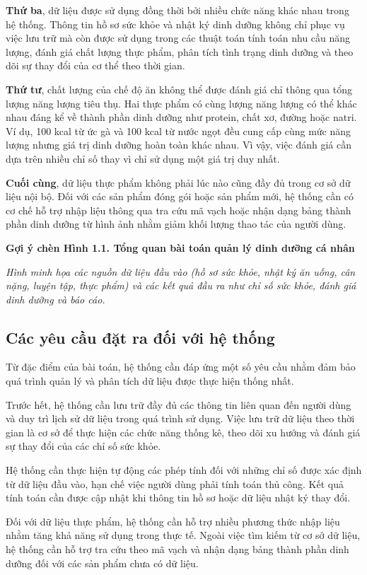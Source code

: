 \documentclass[12pt, a4paper]{report}
\begin{document}
\textbf{Thứ ba}, dữ liệu được sử dụng đồng thời bởi nhiều chức năng khác nhau trong hệ thống. Thông tin hồ sơ sức khỏe và nhật ký dinh dưỡng không chỉ phục vụ việc lưu trữ mà còn được sử dụng trong các thuật toán tính toán nhu cầu năng lượng, đánh giá chất lượng thực phẩm, phân tích tình trạng dinh dưỡng và theo dõi sự thay đổi của cơ thể theo thời gian.

\textbf{Thứ tư}, chất lượng của chế độ ăn không thể được đánh giá chỉ thông qua tổng lượng năng lượng tiêu thụ. Hai thực phẩm có cùng lượng năng lượng có thể khác nhau đáng kể về thành phần dinh dưỡng như protein, chất xơ, đường hoặc natri. Ví dụ, 100 kcal từ ức gà và 100 kcal từ nước ngọt đều cung cấp cùng mức năng lượng nhưng giá trị dinh dưỡng hoàn toàn khác nhau. Vì vậy, việc đánh giá cần dựa trên nhiều chỉ số thay vì chỉ sử dụng một giá trị duy nhất.

\textbf{Cuối cùng}, dữ liệu thực phẩm không phải lúc nào cũng đầy đủ trong cơ sở dữ liệu nội bộ. Đối với các sản phẩm đóng gói hoặc sản phẩm mới, hệ thống cần có cơ chế hỗ trợ nhập liệu thông qua tra cứu mã vạch hoặc nhận dạng bảng thành phần dinh dưỡng từ hình ảnh nhằm giảm khối lượng thao tác của người dùng.

\textbf{Gợi ý chèn Hình 1.1. Tổng quan bài toán quản lý dinh dưỡng cá nhân}

\textit{Hình minh họa các nguồn dữ liệu đầu vào (hồ sơ sức khỏe, nhật ký ăn uống, cân nặng, luyện tập, thực phẩm) và các kết quả đầu ra như chỉ số sức khỏe, đánh giá dinh dưỡng và báo cáo.}

\subsection{Các yêu cầu đặt ra đối với hệ thống}Từ đặc điểm của bài toán, hệ thống cần đáp ứng một số yêu cầu nhằm đảm bảo quá trình quản lý và phân tích dữ liệu được thực hiện thống nhất.

Trước hết, hệ thống cần lưu trữ đầy đủ các thông tin liên quan đến người dùng và duy trì lịch sử dữ liệu trong quá trình sử dụng. Việc lưu trữ dữ liệu theo thời gian là cơ sở để thực hiện các chức năng thống kê, theo dõi xu hướng và đánh giá sự thay đổi của các chỉ số sức khỏe.

Hệ thống cần thực hiện tự động các phép tính đối với những chỉ số được xác định từ dữ liệu đầu vào, hạn chế việc người dùng phải tính toán thủ công. Kết quả tính toán cần được cập nhật khi thông tin hồ sơ hoặc dữ liệu nhật ký thay đổi.

Đối với dữ liệu thực phẩm, hệ thống cần hỗ trợ nhiều phương thức nhập liệu nhằm tăng khả năng sử dụng trong thực tế. Ngoài việc tìm kiếm từ cơ sở dữ liệu, hệ thống cần hỗ trợ tra cứu theo mã vạch và nhận dạng bảng thành phần dinh dưỡng đối với các sản phẩm chưa có dữ liệu.
\end{document}
